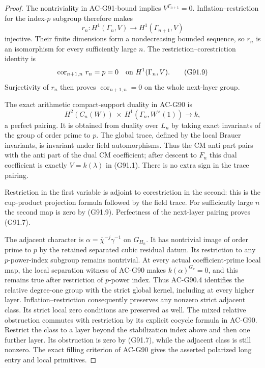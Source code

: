 \begin{proof}
The nontriviality in AC-G91-bound implies
$V^{\Gamma_{n+1}}=0$.  Inflation--restriction for the
index-$p$ subgroup therefore makes
\[
 r_n:H^1(\Gamma_n,V)\longrightarrow H^1(\Gamma_{n+1},V)
 \tag{G91.8}
\]
injective.  Their finite dimensions form a nondecreasing
bounded sequence, so $r_n$ is an isomorphism for every
sufficiently large $n$.  The restriction--corestriction
identity is
\[
       \operatorname{cor}_{n+1,n}\,r_n=p=0
                        \quad\hbox{on }H^1(\Gamma_n,V).
 \tag{G91.9}
\]
Surjectivity of $r_n$ then proves
$\operatorname{cor}_{n+1,n}=0$ on the whole next-layer group.

The exact arithmetic compact-support duality in AC-G90 is
\[
 H^2(C_n(W))\ \times\ H^1(\Gamma_n,W^\vee(1))
                     \longrightarrow k,
 \tag{G91.10}
\]
a perfect pairing.  It is obtained from duality over $L_n$
by taking exact invariants of the group of order prime to $p$.
The global trace, defined by the local Brauer invariants,
is invariant under field automorphisms.  Thus the CM anti
part pairs with the anti part of the dual CM coefficient;
after descent to $F_n$ this dual coefficient is exactly
$V=k(\lambda)$ in (G91.1).  There is no extra sign in the
trace pairing.

Restriction in the first variable is adjoint to
corestriction in the second: this is the cup-product
projection formula followed by the field trace.
For sufficiently large $n$ the second map is zero by
(G91.9).  Perfectness of the next-layer pairing proves
(G91.7).

The adjacent character is
$\alpha=\bar\chi^{-j}\gamma^{-1}$ on $G_{H_n}$.
It has nontrivial image of order prime to $p$ by the
retained separated cubic residual datum.  Its restriction
to any $p$-power-index subgroup remains nontrivial.
At every actual coefficient-prime local map, the local separation
witness of AC-G90 makes $k(\alpha)^{G_v}=0$, and this remains
true after restriction of $p$-power index.  Thus AC-G90.4 identifies
the relative degree-one group with the strict global kernel,
including at every higher layer.
Inflation--restriction consequently preserves any nonzero
strict adjacent class.  Its strict local zero conditions
are preserved as well.  The mixed relative obstruction
commutes with restriction by its explicit cocycle formula
in AC-G90.  Restrict the class to a layer beyond the
stabilization index above and then one further layer.
Its obstruction is zero by (G91.7), while the adjacent
class is still nonzero.  The exact filling criterion of
AC-G90 gives the asserted polarized long entry and local
primitives.
\end{proof}

